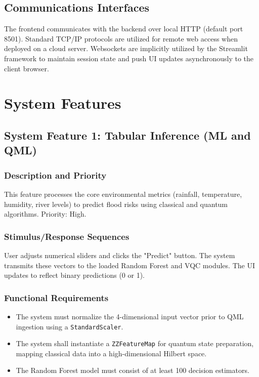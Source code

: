 \documentclass[conference]{IEEEtran}
\begin{document}
\subsection{Communications Interfaces}
The frontend communicates with the backend over local HTTP (default port 8501). Standard TCP/IP protocols are utilized for remote web access when deployed on a cloud server. Websockets are implicitly utilized by the Streamlit framework to maintain session state and push UI updates asynchronously to the client browser.

\section{System Features}

\subsection{System Feature 1: Tabular Inference (ML and QML)}
\subsubsection{Description and Priority}
This feature processes the core environmental metrics (rainfall, temperature, humidity, river levels) to predict flood risks using classical and quantum algorithms. Priority: High.
\subsubsection{Stimulus/Response Sequences}
User adjusts numerical sliders and clicks the "Predict" button. The system transmits these vectors to the loaded Random Forest and VQC modules. The UI updates to reflect binary predictions (0 or 1).
\subsubsection{Functional Requirements}
\begin{itemize}
    \item The system must normalize the 4-dimensional input vector prior to QML ingestion using a \texttt{StandardScaler}.
    \item The system shall instantiate a \texttt{ZZFeatureMap} for quantum state preparation, mapping classical data into a high-dimensional Hilbert space.
    \item The Random Forest model must consist of at least 100 decision estimators.
\end{itemize}
\end{document}
